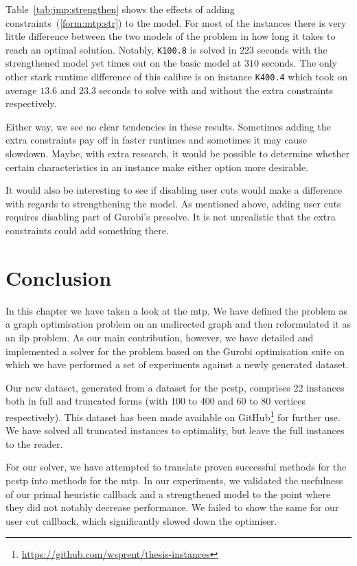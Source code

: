 Table~\ref{tab:jmp:strengthen} shows the effects of adding constraints~(\ref{form:mtp:str}) to
the model. For most of the instances there is very little difference between the two models
of the problem in how long it takes to reach an optimal solution. Notably, \texttt{K100.8} is
solved in $223$ seconds with the strengthened model yet times out on the basic model at $310$
seconds. The only other stark runtime difference of this calibre is on instance \texttt{K400.4}
which took on average $13.6$ and $23.3$ seconds to solve with and without the extra constraints
respectively.

Either way, we see no clear tendencies in these results. Sometimes adding the extra constraints
pay off in faster runtimes and sometimes it may cause slowdown. Maybe, with extra research, it
would be possible to determine whether certain characteristics in an instance make either option
more desirable.

It would also be interesting to see if disabling user cuts would make a difference with regards
to strengthening the model. As mentioned above, adding user cuts requires disabling part of
Gurobi's presolve. It is not unrealistic that the extra constraints could add something there.
\section{Conclusion}
In this chapter we have taken a look at the \acrlong{mtp}. We have defined the problem as
a graph optimisation problem on an undirected graph and then reformulated it as an \gls{ilp}
problem. As our main contribution, however, we have detailed and implemented a solver for the
problem based on the Gurobi optimisation suite on which we have performed a set of experiments
against a newly generated dataset.

Our new dataset, generated from a dataset for the \gls{pcstp}, comprises 22 instances both in
full and truncated forms (with 100 to 400 and 60 to 80 vertices respectively). This dataset
has been made available on
GitHub\footnote{\url{https://github.com/wsprent/thesis-instances}}
for further use. We have solved all truncated instances to
optimality, but leave the full instances to the reader.

For our solver, we have attempted to translate proven successful methods for the \gls{pcstp}
into methods for
the \gls{mtp}.
In our experiments, we validated the usefulness of our primal heuristic callback and
a strengthened model to the point where they did not notably decrease performance.
We failed to show the same for our user cut callback, which significantly slowed down the
optimiser.

